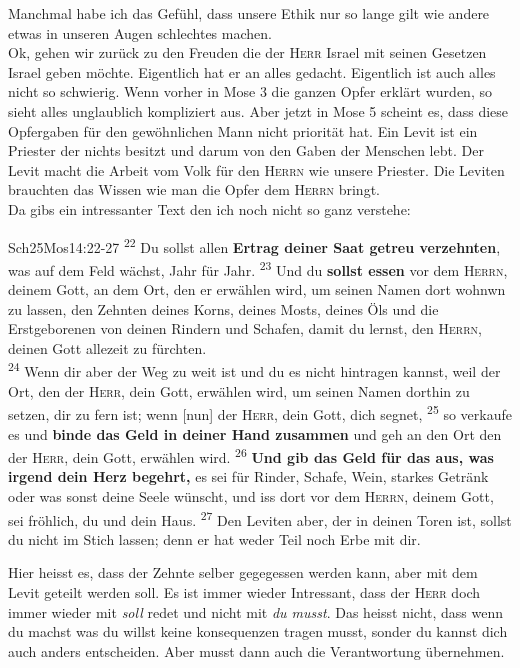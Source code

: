 Manchmal habe ich das Gefühl, dass unsere Ethik nur so lange gilt wie andere etwas in unseren Augen schlechtes machen.\\
Ok, gehen wir zurück zu den Freuden die der \textsc{Herr} Israel mit seinen Gesetzen Israel geben möchte. Eigentlich hat er an alles gedacht. Eigentlich ist auch alles nicht so schwierig. Wenn vorher in Mose 3 die ganzen Opfer erklärt wurden, so sieht alles unglaublich kompliziert aus. Aber jetzt in Mose 5 scheint es, dass diese Opfergaben für den gewöhnlichen Mann nicht priorität hat. Ein Levit ist ein Priester der nichts besitzt und darum von den Gaben der Menschen lebt. Der Levit macht die Arbeit vom Volk für den \textsc{Herrn} wie unsere Priester. Die Leviten brauchten das Wissen wie man die Opfer dem \textsc{Herrn} bringt.\\
Da gibs ein intressanter Text den ich noch nicht so ganz verstehe:
\begin{bibeltext}{Sch2}{5Mos}{14:22-27}
    \textsuperscript{22} Du sollst allen \textbf{Ertrag deiner Saat getreu verzehnten}, was auf dem Feld wächst, Jahr für Jahr. \textsuperscript{23} Und du \textbf{sollst essen} vor dem \textsc{Herrn}, deinem Gott, an dem Ort, den er erwählen wird, um seinen Namen dort wohnwn zu lassen, den Zehnten deines Korns, deines Mosts, deines Öls und die Erstgeborenen von deinen Rindern und Schafen, damit du lernst, den \textsc{Herrn}, deinen Gott allezeit zu fürchten.\\
    \textsuperscript{24} Wenn dir aber der Weg zu weit ist und du es nicht hintragen kannst, weil der Ort, den der \textsc{Herr}, dein Gott, erwählen wird, um seinen Namen dorthin zu setzen, dir zu fern ist; wenn [nun] der \textsc{Herr}, dein Gott, dich segnet, \textsuperscript{25} so verkaufe es und \textbf{binde das Geld in deiner Hand zusammen} und geh an den Ort den der \textsc{Herr}, dein Gott, erwählen wird. \textsuperscript{26} \textbf{Und gib das Geld für das aus, was irgend dein Herz begehrt,} es sei für Rinder, Schafe, Wein, starkes Getränk oder was sonst deine Seele wünscht, und iss dort vor dem \textsc{Herrn}, deinem Gott, sei fröhlich, du und dein Haus. \textsuperscript{27} Den Leviten aber, der in deinen Toren ist, sollst du nicht im Stich lassen; denn er hat weder Teil noch Erbe mit dir.
\end{bibeltext}
Hier heisst es, dass der Zehnte selber gegegessen werden kann, aber mit dem Levit geteilt werden soll. Es ist immer wieder Intressant, dass der \textsc{Herr} doch immer wieder mit \textit{soll} redet und nicht mit \textit{du musst}. Das heisst nicht, dass wenn du machst was du willst keine konsequenzen tragen musst, sonder du kannst dich auch anders entscheiden. Aber musst dann auch die Verantwortung übernehmen.

